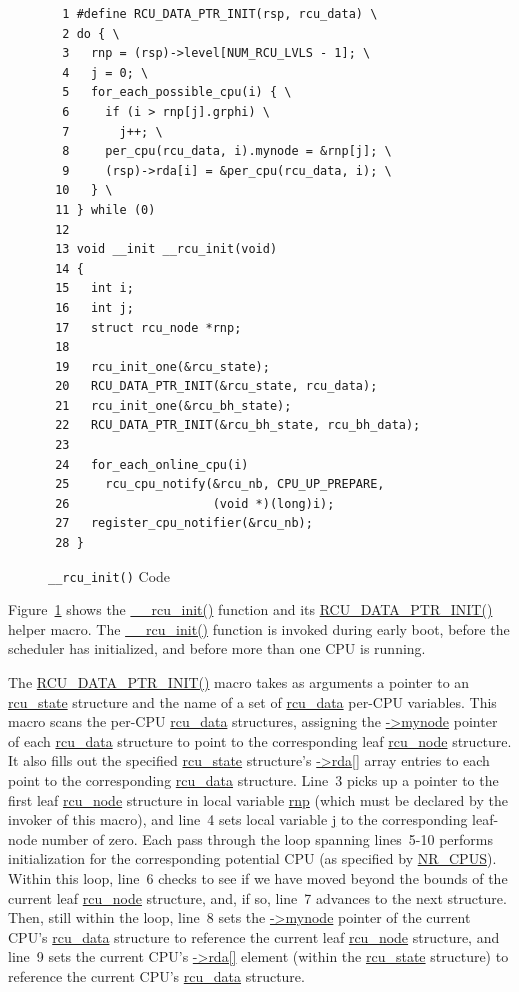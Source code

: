 \begin{figure}[tbp]
{ \scriptsize
\begin{verbatim}
  1 #define RCU_DATA_PTR_INIT(rsp, rcu_data) \
  2 do { \
  3   rnp = (rsp)->level[NUM_RCU_LVLS - 1]; \
  4   j = 0; \
  5   for_each_possible_cpu(i) { \
  6     if (i > rnp[j].grphi) \
  7       j++; \
  8     per_cpu(rcu_data, i).mynode = &rnp[j]; \
  9     (rsp)->rda[i] = &per_cpu(rcu_data, i); \
 10   } \
 11 } while (0)
 12 
 13 void __init __rcu_init(void)
 14 {
 15   int i;
 16   int j;
 17   struct rcu_node *rnp;
 18 
 19   rcu_init_one(&rcu_state);
 20   RCU_DATA_PTR_INIT(&rcu_state, rcu_data);
 21   rcu_init_one(&rcu_bh_state);
 22   RCU_DATA_PTR_INIT(&rcu_bh_state, rcu_bh_data);
 23 
 24   for_each_online_cpu(i)
 25     rcu_cpu_notify(&rcu_nb, CPU_UP_PREPARE,
 26                    (void *)(long)i);
 27   register_cpu_notifier(&rcu_nb);
 28 }
\end{verbatim}
}
\caption{{\tt \_\_rcu\_init()} Code}
\label{fig:app:rcuimpl:rcutreewt:Code for rcu-init}
\end{figure}

Figure~\ref{fig:app:rcuimpl:rcutreewt:Code for rcu-init}
shows the \url{__rcu_init()} function and its \url{RCU_DATA_PTR_INIT()}
helper macro.
The \url{__rcu_init()} function is invoked during early boot,
before the scheduler has initialized, and before more than one
CPU is running.

The \url{RCU_DATA_PTR_INIT()} macro takes as arguments a pointer to
an \url{rcu_state} structure and the name of a set of \url{rcu_data}
per-CPU variables.
This macro scans the per-CPU \url{rcu_data}
structures, assigning the \url{->mynode} pointer of each \url{rcu_data}
structure to point to the corresponding leaf \url{rcu_node} structure.
It also fills out the specified \url{rcu_state} structure's
\url{->rda[]} array entries to each point to the corresponding
\url{rcu_data} structure.
Line~3 picks up a pointer to the first leaf \url{rcu_node} structure
in local variable \url{rnp} (which must be declared by the invoker of
this macro),
and line~4 sets local variable \url{j} to the corresponding leaf-node
number of zero.
Each pass through the loop spanning lines~5-10 performs initialization
for the corresponding potential CPU (as specified by \url{NR_CPUS}).
Within this loop, line~6 checks to see if we have moved beyond the
bounds of the current leaf \url{rcu_node} structure, and, if so,
line~7 advances to the next structure.
Then, still within the loop, line~8 sets the \url{->mynode} pointer
of the current CPU's \url{rcu_data} structure to reference the current
leaf \url{rcu_node} structure, and line~9 sets the current CPU's \url{->rda[]}
element (within the \url{rcu_state} structure) to reference the
current CPU's \url{rcu_data} structure.

